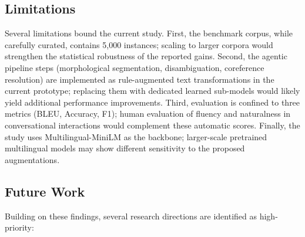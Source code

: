 \subsection*{Limitations}

Several limitations bound the current study.  First, the benchmark corpus, while carefully
curated, contains 5{,}000 instances; scaling to larger corpora would strengthen the statistical
robustness of the reported gains.  Second, the agentic pipeline steps (morphological
segmentation, disambiguation, coreference resolution) are implemented as rule-augmented text
transformations in the current prototype; replacing them with dedicated learned sub-models would
likely yield additional performance improvements.  Third, evaluation is confined to three
metrics (BLEU, Accuracy, F1); human evaluation of fluency and naturalness in conversational
interactions would complement these automatic scores.  Finally, the study uses
Multilingual-MiniLM as the backbone; larger-scale pretrained multilingual models may show
different sensitivity to the proposed augmentations.

\subsection*{Future Work}

Building on these findings, several research directions are identified as high-priority:

